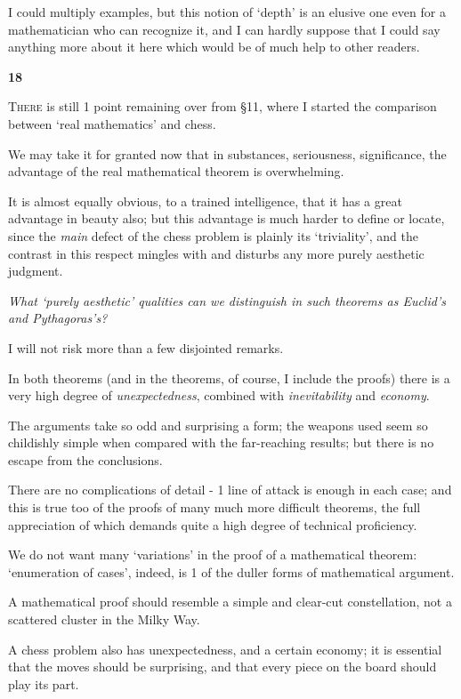 \documentclass{article}
\numberwithin{equation}{section}
\begin{document}
%
I could multiply examples, but this notion of `depth' is an elusive one even for a mathematician who can recognize it, and I can hardly suppose that I could say anything more about it here which would be of much help to other readers.

\begin{center}
    \large\textbf{18}
\end{center}
\textsc{There} is still 1 point remaining over from \S11, where I started the comparison between `real mathematics' and chess.

We may take it for granted now that in substances, seriousness, significance, the advantage of the real mathematical theorem is overwhelming.

It is almost equally obvious, to a trained intelligence, that it has a great advantage in beauty also; but this advantage is much harder to define or locate, since the \textit{main} defect of the chess problem is plainly its `triviality', and the contrast in this respect mingles with and disturbs any more purely aesthetic judgment.

\textit{What `purely aesthetic' qualities can we distinguish in such theorems as Euclid's and Pythagoras's?}

I will not risk more than a few disjointed remarks.

%
In both theorems (and in the theorems, of course, I include the proofs) there is a very high degree of \textit{unexpectedness}, combined with \textit{inevitability} and \textit{economy}.

The arguments take so odd and surprising a form; the weapons used seem so childishly simple when compared with the far-reaching results; but there is no escape from the conclusions.

There are no complications of detail - 1 line of attack is enough in each case; and this is true too of the proofs of many much more difficult theorems, the full appreciation of which demands quite a high degree of technical proficiency.

We do not want many `variations' in the proof of a mathematical theorem: `enumeration of cases', indeed, is 1 of the duller forms of mathematical argument.

A mathematical proof should resemble a simple and clear-cut constellation, not a scattered cluster in the Milky Way.

%
A chess problem also has unexpectedness, and a certain economy; it is essential that the moves should be surprising, and that every piece on the board should play its part.
\end{document}
